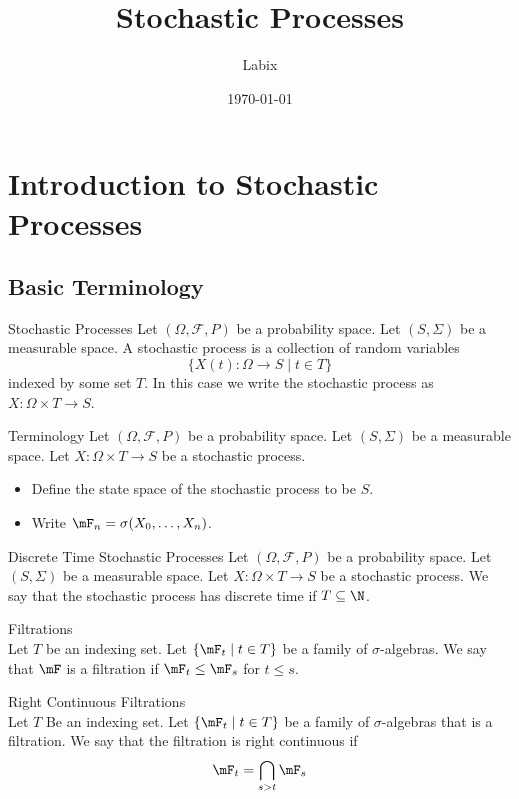 \documentclass[a4paper]{article}
\title{Stochastic Processes}
\author{Labix}
\date{\today}
\begin{document}
\maketitle
\begin{abstract}
\end{abstract}
\pagebreak
\tableofcontents

\pagebreak
\section{Introduction to Stochastic Processes}
\subsection{Basic Terminology}
\begin{defn}{Stochastic Processes}{} Let $(\Omega,\mathcal{F},P)$ be a probability space. Let $(S,\Sigma)$ be a measurable space. A stochastic process is a collection of random variables $$\{X(t):\Omega\to S\;|\;t\in T\}$$ indexed by some set $T$. In this case we write the stochastic process as $X:\Omega\times T\to S$. 
\end{defn}

\begin{defn}{Terminology}{} Let $(\Omega,\mathcal{F},P)$ be a probability space. Let $(S,\Sigma)$ be a measurable space. Let $X:\Omega\times T\to S$ be a stochastic process. 
\begin{itemize}
\item Define the state space of the stochastic process to be $S$. 
\item Write $\mF_n=\sigma(X_0,\dots,X_n)$. 
\end{itemize}
\end{defn}

\begin{defn}{Discrete Time Stochastic Processes}{} Let $(\Omega,\mathcal{F},P)$ be a probability space. Let $(S,\Sigma)$ be a measurable space. Let $X:\Omega\times T\to S$ be a stochastic process. We say that the stochastic process has discrete time if $T\subseteq\N$. 
\end{defn}

\begin{defn}{Filtrations}{}\\
Let $T$ be an indexing set. Let $\{\mF_t\;|\;t\in T\}$ be a family of $\sigma$-algebras. We say that $\mF$ is a filtration if $\mF_t\leq\mF_s$ for $t\leq s$. 
\end{defn}

\begin{defn}{Right Continuous Filtrations}{}\\
Let $T$ Be an indexing set. Let $\{\mF_t\;|\;t\in T\}$ be a family of $\sigma$-algebras that is a filtration. We say that the filtration is right continuous if $$\mF_t=\bigcap_{s>t}\mF_s$$
\end{defn}
\end{document}
